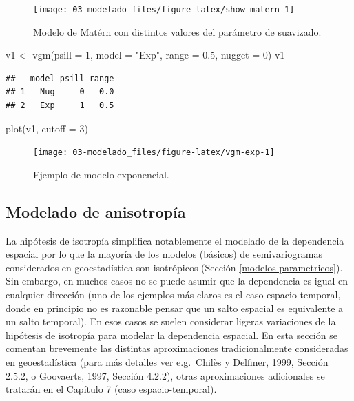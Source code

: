 \documentclass[
  spanish,
]{book}
\newenvironment{Shaded}{\begin{snugshade}}{\end{snugshade}}
\newcommand{\AttributeTok}[1]{\textcolor[rgb]{0.77,0.63,0.00}{#1}}
\newcommand{\DecValTok}[1]{\textcolor[rgb]{0.00,0.00,0.81}{#1}}
\newcommand{\FloatTok}[1]{\textcolor[rgb]{0.00,0.00,0.81}{#1}}
\newcommand{\FunctionTok}[1]{\textcolor[rgb]{0.00,0.00,0.00}{#1}}
\newcommand{\NormalTok}[1]{#1}
\newcommand{\OtherTok}[1]{\textcolor[rgb]{0.56,0.35,0.01}{#1}}
\newcommand{\StringTok}[1]{\textcolor[rgb]{0.31,0.60,0.02}{#1}}
\theoremstyle{break}
\theoremstyle{definition}
\theoremstyle{definition}
\theoremstyle{definition}
\theoremstyle{definition}
\theoremstyle{remark}
\begin{document}
\begin{figure}[!htb]

{\centering \texttt{[image: 03-modelado\_files/figure-latex/show-matern-1]} 

}

\caption{Modelo de Matérn con distintos valores del parámetro de suavizado.}\label{fig:show-matern}
\end{figure}

\begin{Shaded}
\begin{Highlighting}[]
\NormalTok{v1 }\OtherTok{\textless{}{-}} \FunctionTok{vgm}\NormalTok{(}\AttributeTok{psill =} \DecValTok{1}\NormalTok{, }\AttributeTok{model =} \StringTok{"Exp"}\NormalTok{, }\AttributeTok{range =} \FloatTok{0.5}\NormalTok{, }\AttributeTok{nugget =} \DecValTok{0}\NormalTok{)}
\NormalTok{v1}
\end{Highlighting}
\end{Shaded}

\begin{verbatim}
##   model psill range
## 1   Nug     0   0.0
## 2   Exp     1   0.5
\end{verbatim}

\begin{Shaded}
\begin{Highlighting}[]
\FunctionTok{plot}\NormalTok{(v1, }\AttributeTok{cutoff =} \DecValTok{3}\NormalTok{)}
\end{Highlighting}
\end{Shaded}

\begin{figure}[!htb]

{\centering \texttt{[image: 03-modelado\_files/figure-latex/vgm-exp-1]} 

}

\caption{Ejemplo de modelo exponencial.}\label{fig:vgm-exp}
\end{figure}

\hypertarget{anisotropia}{%
\subsection{Modelado de anisotropía}\label{anisotropia}}

La hipótesis de isotropía simplifica notablemente el modelado de la dependencia espacial por lo que la mayoría de los modelos (básicos) de semivariogramas considerados en geoestadística son isotrópicos (Sección \ref{modelos-parametricos}).
Sin embargo, en muchos casos no se puede asumir que la dependencia es igual en cualquier dirección (uno de los ejemplos más claros es el caso espacio-temporal, donde en principio no es razonable pensar que un salto espacial es equivalente a un salto temporal).
En esos casos se suelen considerar ligeras variaciones de la hipótesis de isotropía para modelar la dependencia espacial.
En esta sección se comentan brevemente las distintas aproximaciones tradicionalmente consideradas en geoestadística (para más detalles ver e.g.~Chilès y Delfiner, 1999, Sección 2.5.2, o Goovaerts, 1997, Sección 4.2.2), otras aproximaciones adicionales se tratarán en el Capítulo 7 (caso espacio-temporal).
\end{document}
